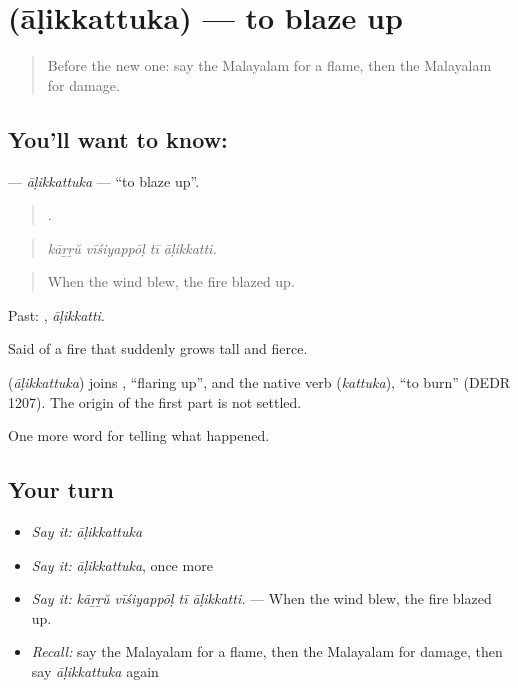 \section[\texorpdfstring{\ml{ആളിക്കത്തുക} (āḷikkattuka)}{ആളിക്കത്തുക (āḷikkattuka)}]{ (āḷikkattuka) — to blaze up}

\label{lesson:ML-C363-alikkattuka}



\begin{quote}
Before the new one: say the Malayalam for a flame, then the Malayalam for damage.
\end{quote}

\subsection*{You'll want to know: }
\textbf{} — \emph{āḷikkattuka} — \textquotedblleft{}to blaze up\textquotedblright{}.

\begin{quote}
   .
\end{quote}

\begin{quote}
\emph{kāṟṟŭ vīśiyappōḷ tī āḷikkatti.}
\end{quote}

\begin{quote}
When the wind blew, the fire blazed up.
\end{quote}

Past: , \emph{āḷikkatti}.

Said of a fire that suddenly grows tall and fierce.

\begin{cousinweb}
\textbf{} (\emph{āḷikkattuka}) joins , \textquotedblleft{}flaring up\textquotedblright{}, and the native verb  (\emph{kattuka}), \textquotedblleft{}to burn\textquotedblright{} (DEDR 1207). The origin of the first part is not settled.
\end{cousinweb}

\begin{grammarlens}[title={What you've built}]
One more word for telling what happened.
\end{grammarlens}

\subsection*{Your turn}
\begin{itemize}
\raggedright
  \item \emph{Say it:} \emph{āḷikkattuka}
  \item \emph{Say it:} \emph{āḷikkattuka}, once more
  \item \emph{Say it:} \emph{kāṟṟŭ vīśiyappōḷ tī āḷikkatti.} — When the wind blew, the fire blazed up.
  \item \emph{Recall:} say the Malayalam for a flame, then the Malayalam for damage, then say \emph{āḷikkattuka} again
\end{itemize}

